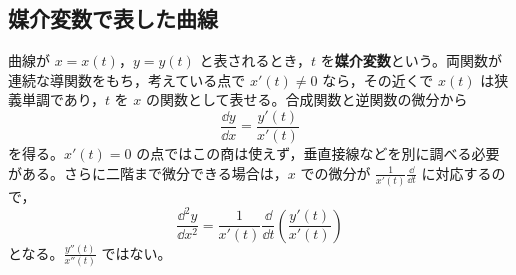 \subsection{媒介変数で表した曲線}
曲線が $x=x(t)$，$y=y(t)$ と表されるとき，$t$ を\textbf{媒介変数}という。両関数が連続な導関数をもち，考えている点で $x'(t)\ne0$ なら，その近くで $x(t)$ は狭義単調であり，$t$ を $x$ の関数として表せる。合成関数と逆関数の微分から
\[
 \frac{\dd y}{\dd x}
 =\frac{y'(t)}{x'(t)}
\]
を得る。$x'(t)=0$ の点ではこの商は使えず，垂直接線などを別に調べる必要がある。さらに二階まで微分できる場合は，$x$ での微分が $\frac1{x'(t)}\frac{\dd}{\dd t}$ に対応するので，
\[
 \frac{\dd^2y}{\dd x^2}
 =\frac1{x'(t)}\frac{\dd}{\dd t}
   \left(\frac{y'(t)}{x'(t)}\right)
\]
となる。$\frac{y''(t)}{x''(t)}$ ではない。

